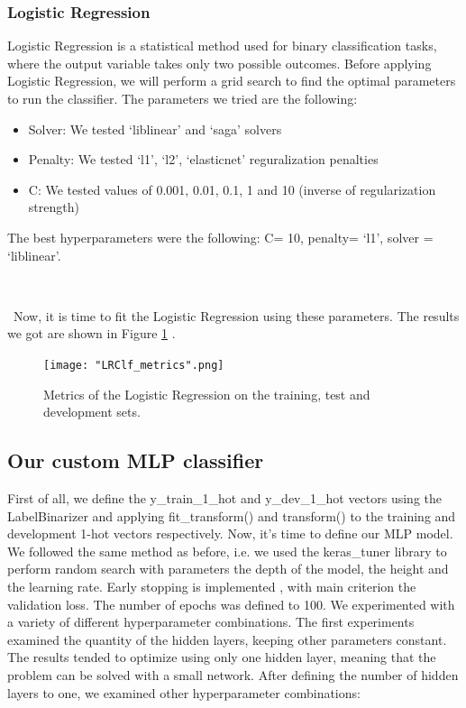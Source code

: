 \documentclass[10pt, a4paper]{article}
\begin{document}
    \subsubsection{Logistic Regression}
    Logistic Regression is a statistical method used for binary classification tasks, where the output variable takes only two possible outcomes.
    Before applying Logistic Regression, we will perform a grid search to find the optimal parameters to run the classifier. The parameters we tried are the following:
    \begin{itemize}
    \item{Solver: We tested ‘liblinear’ and ‘saga’ solvers}
    \item{Penalty: We tested ‘l1’, ‘l2’, ‘elasticnet’ reguralization penalties}
    \item{C: We tested values of 0.001, 0.01, 0.1, 1 and 10 (inverse of regularization strength)}
    \end{itemize}

    The best hyperparameters were the following:
    C= 10, penalty= ‘l1’, solver = ‘liblinear’.
    
    \ 

    \ 
    Now, it is time to fit the Logistic Regression using these parameters. The results we got are shown in Figure \ref{fig::LR_metrics} .

    \begin{figure}
	    \centering
            \texttt{[image: "LRClf\_metrics".png]}
	    \caption{Metrics of the Logistic Regression on the training, test and development sets.}
	    \label{fig::LR_metrics}
     \end{figure}


    \subsection{Our custom MLP classifier}

    First of all, we define the y\_train\_1\_hot and y\_dev\_1\_hot vectors using the LabelBinarizer and applying fit\_transform() and transform() to the training and development 1-hot vectors respectively.
    Now, it’s time to define our MLP model. We followed the same method as before, i.e. we used the keras\_tuner library to perform random search with parameters the depth of the model, the height and the learning rate.
    Early stopping is implemented , with main criterion the validation loss. The number of epochs was defined to 100. We experimented with a variety of different hyperparameter combinations. The first experiments examined the quantity of the hidden layers, keeping other parameters constant. The results tended to optimize using only one hidden layer, meaning that the problem can be solved with a small network. After defining the number of hidden layers to one, we examined other hyperparameter combinations:
\end{document}
